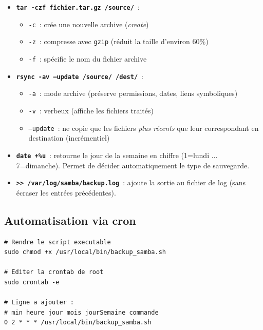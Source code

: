 \documentclass[12pt,a4paper]{article}
\begin{document}
\begin{explainbox}
\begin{itemize}[leftmargin=1.5em,topsep=2pt]
  \item \textbf{\texttt{tar -czf fichier.tar.gz /source/}}~:
    \begin{itemize}[leftmargin=1.5em]
      \item \texttt{-c}~: crée une nouvelle archive (\textit{create})
      \item \texttt{-z}~: compresse avec \texttt{gzip} (réduit la taille d'environ 60\%)
      \item \texttt{-f}~: spécifie le nom du fichier archive
    \end{itemize}
  \item \textbf{\texttt{rsync -av --update /source/ /dest/}}~:
    \begin{itemize}[leftmargin=1.5em]
      \item \texttt{-a}~: mode archive (préserve permissions, dates, liens symboliques)
      \item \texttt{-v}~: verbeux (affiche les fichiers traités)
      \item \texttt{--update}~: ne copie que les fichiers \textit{plus récents} que leur
        correspondant en destination (incrémentiel)
    \end{itemize}
  \item \textbf{\texttt{date +\%u}}~: retourne le jour de la semaine en chiffre
    (1=lundi ... 7=dimanche). Permet de décider automatiquement le type de sauvegarde.
  \item \textbf{\texttt{>> /var/log/samba/backup.log}}~: ajoute la sortie au fichier de
    log (sans écraser les entrées précédentes).
\end{itemize}
\end{explainbox}

\subsection{Automatisation via cron}

\begin{lstlisting}[style=terminal]
# Rendre le script executable
sudo chmod +x /usr/local/bin/backup_samba.sh

# Editer la crontab de root
sudo crontab -e

# Ligne a ajouter :
# min heure jour mois jourSemaine commande
0 2 * * * /usr/local/bin/backup_samba.sh
\end{lstlisting}
\end{document}
